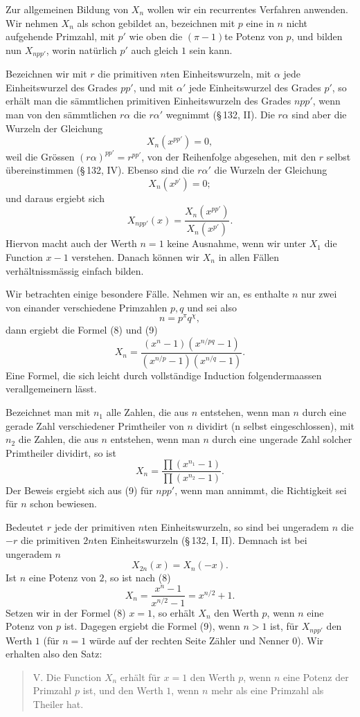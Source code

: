 \documentclass[11pt]{article}
\begin{document}
Zur allgemeinen Bildung von $X_n$ wollen wir ein recurrentes Verfahren anwenden. Wir nehmen $X_n$ als schon gebildet an, bezeichnen mit $p$ eine in $n$ nicht aufgehende Primzahl, mit $p'$ wie oben die $(\pi-1)$te Potenz von $p$, und bilden nun $X_{npp'}$, worin natürlich $p'$ auch gleich $1$ sein kann.

Bezeichnen wir mit $r$ die primitiven $n$ten Einheitswurzeln, mit $\alpha$ jede Einheitswurzel des Grades $pp'$, und mit $\alpha'$ jede Einheitswurzel des Grades $p'$, so erhält man die sämmtlichen primitiven Einheitswurzeln des Grades $npp'$, wenn man von den sämmtlichen $r\alpha$ die $r\alpha'$ wegnimmt (\S\,132, II). Die $r\alpha$ sind aber die Wurzeln der Gleichung
\[
        X_n(x^{pp'})=0,
\]
weil die Grössen $(r\alpha)^{pp'}=r^{pp'}$, von der Reihenfolge abgesehen, mit den $r$ selbst übereinstimmen (\S\,132, IV). Ebenso sind die $r\alpha'$ die Wurzeln der Gleichung
\[
        X_n(x^{p'})=0;
\]
und daraus ergiebt sich
\[
\tag{9}        X_{npp'}(x)=\frac{X_n(x^{pp'})}{X_n(x^{p'})}.
\]
Hiervon macht auch der Werth $n=1$ keine Ausnahme, wenn wir unter $X_1$ die Function $x-1$ verstehen. Danach können wir $X_n$ in allen Fällen verhältnissmässig einfach bilden.

Wir betrachten einige besondere Fälle. Nehmen wir an, es enthalte $n$ nur zwei von einander verschiedene Primzahlen $p,q$ und sei also
\[
        n=p^\pi q^\chi,
\]
dann ergiebt die Formel (8) und (9)
\[
        X_n=\frac{(x^n-1)(x^{n/pq}-1)}{(x^{n/p}-1)(x^{n/q}-1)}.
\]
Eine Formel, die sich leicht durch vollständige Induction folgendermaassen verallgemeinern lässt.

Bezeichnet man mit $n_1$ alle Zahlen, die aus $n$ entstehen, wenn man $n$ durch eine gerade Zahl verschiedener Primtheiler von $n$ dividirt (n selbst eingeschlossen), mit $n_2$ die Zahlen, die aus $n$ entstehen, wenn man $n$ durch eine ungerade Zahl solcher Primtheiler dividirt, so ist
\[
\tag{10}       X_n=\frac{\prod(x^{n_1}-1)}{\prod(x^{n_2}-1)}.
\]
Der Beweis ergiebt sich aus (9) für $npp'$, wenn man annimmt, die Richtigkeit sei für $n$ schon bewiesen.

Bedeutet $r$ jede der primitiven $n$ten Einheitswurzeln, so sind bei ungeradem $n$ die $-r$ die primitiven $2n$ten Einheitswurzeln (\S\,132, I, II). Demnach ist bei ungeradem $n$
\[
\tag{11}       X_{2n}(x)=X_n(-x).
\]
Ist $n$ eine Potenz von $2$, so ist nach (8)
\[
\tag{12}       X_n=\frac{x^n-1}{x^{n/2}-1}=x^{n/2}+1.
\]
Setzen wir in der Formel (8) $x=1$, so erhält $X_n$ den Werth $p$, wenn $n$ eine Potenz von $p$ ist. Dagegen ergiebt die Formel (9), wenn $n>1$ ist, für $X_{npp'}$ den Werth $1$ (für $n=1$ würde auf der rechten Seite Zähler und Nenner $0$). Wir erhalten also den Satz:
\begin{quote}
V. Die Function $X_n$ erhält für $x=1$ den Werth $p$, wenn $n$ eine Potenz der Primzahl $p$ ist, und den Werth $1$, wenn $n$ mehr als eine Primzahl als Theiler hat.
\end{quote}
\end{document}
